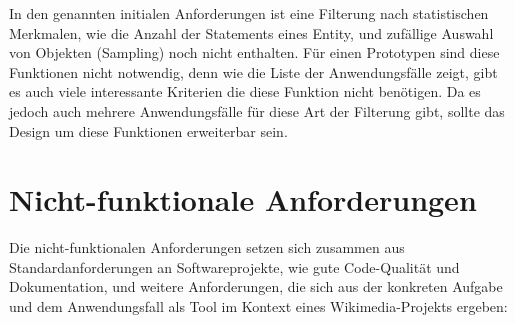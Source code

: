 In den genannten initialen Anforderungen ist eine Filterung nach statistischen Merkmalen, wie die Anzahl der Statements eines Entity, und zufällige Auswahl von Objekten (Sampling) noch nicht enthalten.
Für einen Prototypen sind diese Funktionen nicht notwendig, denn wie die Liste der Anwendungsfälle zeigt, gibt es auch viele interessante Kriterien die diese Funktion nicht benötigen.
Da es jedoch auch mehrere Anwendungsfälle für diese Art der Filterung gibt, sollte das Design um diese Funktionen erweiterbar sein.

\section{Nicht-funktionale Anforderungen}
Die nicht-funktionalen Anforderungen setzen sich zusammen aus Standardanforderungen an Softwareprojekte, wie gute Code-Qualität und Dokumentation, und weitere Anforderungen, die sich aus der konkreten Aufgabe und dem Anwendungsfall als Tool im Kontext eines Wikimedia-Projekts ergeben:
